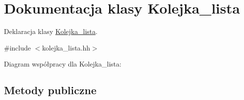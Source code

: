 \hypertarget{class_kolejka__lista}{\section{\-Dokumentacja klasy \-Kolejka\-\_\-lista}
\label{class_kolejka__lista}
}


\-Deklaracja klasy \hyperlink{class_kolejka__lista}{\-Kolejka\-\_\-lista}.  




{\ttfamily \#include $<$kolejka\-\_\-lista.\-hh$>$}



\-Diagram współpracy dla \-Kolejka\-\_\-lista\-:
\subsection*{\-Metody publiczne}
